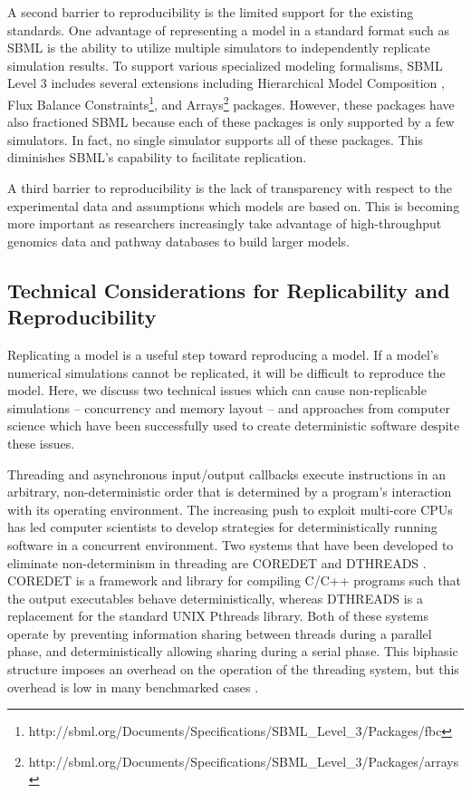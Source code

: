 \documentclass[journal,transmag,twoside]{IEEEtran}
\begin{document}
A second barrier to reproducibility is the limited support for the existing standards.
One advantage of representing a model in a standard format such as SBML is the ability
to utilize multiple simulators to independently replicate simulation results. To support various specialized
modeling formalisms, SBML Level 3 includes several extensions including
Hierarchical Model Composition \cite{smith2015sbml},
Flux Balance Constraints\footnote{http://sbml.org/Documents/Specifications/SBML\_Level\_3/Packages/fbc}, and
Arrays\footnote{http://sbml.org/Documents/Specifications/SBML\_Level\_3/Packages/arrays} packages.
However, these packages have also fractioned SBML because each of these packages is only supported by a few simulators. 
In fact, no single simulator supports all of these packages.
This diminishes SBML's capability to facilitate replication.

A third barrier to reproducibility is the lack of transparency with respect to the experimental data and assumptions which models are based on.
This is becoming more important as researchers increasingly take advantage of high-throughput genomics data and pathway databases to build larger models.

\subsection{Technical Considerations for Replicability and Reproducibility}

Replicating a model is a useful step toward reproducing a model.
If a model's numerical simulations cannot be replicated, it will be
difficult to reproduce the model. Here, we discuss two technical issues which can 
cause non-replicable simulations -- concurrency and memory layout -- 
and approaches from computer science which have been successfully used to create 
deterministic software despite these issues.

Threading and asynchronous input/output callbacks execute instructions in an arbitrary,
non-deterministic order that is determined by a program's interaction with 
its operating environment. The increasing push to exploit multi-core CPUs has
led computer scientists to develop strategies for deterministically running software 
in a concurrent environment. Two systems that have been developed to eliminate non-determinism in threading
are C{\small ORE}D{\small ET} \cite{bergan2010coredet} and D{\small THREADS} \cite{liu2011dthreads}.
C{\small ORE}D{\small ET} is a framework and library for compiling C/C++ programs
such that the output executables behave deterministically, whereas
D{\small THREADS} is a replacement for the standard UNIX Pthreads library.
Both of these systems operate by preventing information sharing between
threads during a parallel phase, and deterministically allowing sharing
during a serial phase.
This biphasic structure imposes an overhead on the operation of the threading
system, but this overhead is low in many benchmarked cases \cite{liu2011dthreads}. 
\end{document}
